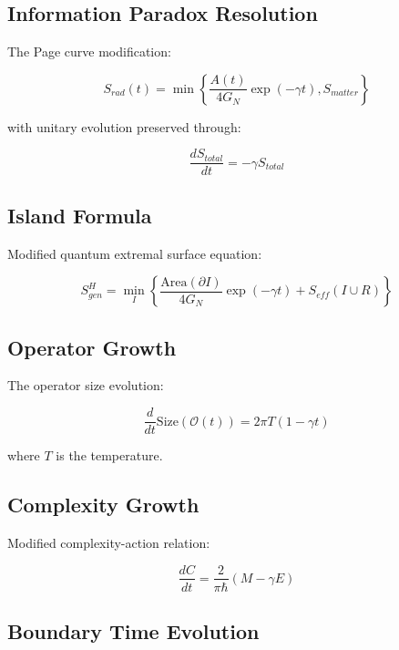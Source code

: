\documentclass[12pt]{article}
\theoremstyle{plain}
\theoremstyle{definition}
\theoremstyle{remark}
\begin{document}
\subsection{Information Paradox Resolution}

The Page curve modification:

\begin{equation}
S_{rad}(t) = \min\left\{\frac{A(t)}{4G_N}\exp(-\gamma t), S_{matter}\right\}
\end{equation}

with unitary evolution preserved through:

\begin{equation}
\frac{dS_{total}}{dt} = -\gamma S_{total}
\end{equation}

\subsection{Island Formula}

Modified quantum extremal surface equation:

\begin{equation}
S_{gen}^H = \min_I \left\{\frac{\text{Area}(\partial I)}{4G_N}\exp(-\gamma t) + S_{eff}(I \cup R)\right\}
\end{equation}

\subsection{Operator Growth}

The operator size evolution:

\begin{equation}
\frac{d}{dt}\text{Size}(\mathcal{O}(t)) = 2\pi T(1 - \gamma t)
\end{equation}

where $T$ is the temperature.

\subsection{Complexity Growth}

Modified complexity-action relation:

\begin{equation}
\frac{dC}{dt} = \frac{2}{\pi\hbar}(M - \gamma E)
\end{equation}

\subsection{Boundary Time Evolution}
\end{document}
